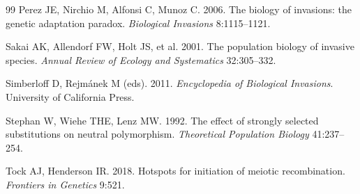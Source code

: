 \documentclass[11pt]{article}
\theoremstyle{remark}
\begin{document}
\begin{thebibliography}{99}
Perez JE, Nirchio M, Alfonsi C, Munoz C. 2006. The biology of invasions: the
genetic adaptation paradox. \emph{Biological Invasions} 8:1115--1121.

Sakai AK, Allendorf FW, Holt JS, et al. 2001. The population biology of invasive
species. \emph{Annual Review of Ecology and Systematics} 32:305--332.

Simberloff D, Rejm\'anek M (eds). 2011. \emph{Encyclopedia of Biological
Invasions}. University of California Press.

Stephan W, Wiehe THE, Lenz MW. 1992. The effect of strongly selected
substitutions on neutral polymorphism. \emph{Theoretical Population Biology}
41:237--254.

Tock AJ, Henderson IR. 2018. Hotspots for initiation of meiotic recombination.
\emph{Frontiers in Genetics} 9:521.

\end{thebibliography}
\end{document}
